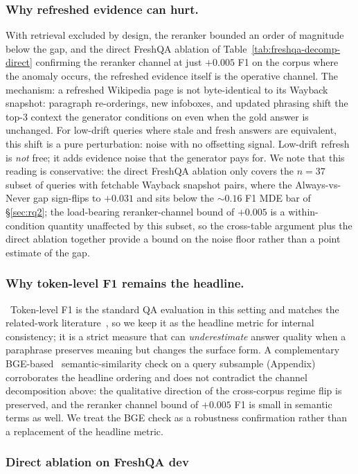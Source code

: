 \documentclass[pdflatex,sn-basic]{sn-jnl}
\begin{document}
\subsubsection*{Why refreshed evidence can hurt.}
With retrieval excluded by design, the reranker bounded an order of magnitude below the gap, and the direct FreshQA ablation of Table~\ref{tab:freshqa-decomp-direct} confirming the reranker channel at just $+0.005$ F1 on the corpus where the anomaly occurs, the refreshed evidence itself is the operative channel. The mechanism: a refreshed Wikipedia page is not byte-identical to its Wayback snapshot: paragraph re-orderings, new infoboxes, and updated phrasing shift the top-$3$ context the generator conditions on even when the gold answer is unchanged. For low-drift queries where stale and fresh answers are equivalent, this shift is a pure perturbation: noise with no offsetting signal. Low-drift refresh is \emph{not} free; it adds evidence noise that the generator pays for. We note that this reading is conservative: the direct FreshQA ablation only covers the $n{=}37$ subset of queries with fetchable Wayback snapshot pairs, where the Always-vs-Never gap sign-flips to $+0.031$ and sits below the ${\sim}0.16$ F1 MDE bar of §\ref{sec:rq2}; the load-bearing reranker-channel bound of $+0.005$ is a within-condition quantity unaffected by this subset, so the cross-table argument plus the direct ablation together provide a bound on the noise floor rather than a point estimate of the gap.

\subsubsection*{Why token-level F1 remains the headline.}~Token-level F1 is the standard QA evaluation in this setting and matches the related-work literature~\cite{vu2023freshqa,vu2023freshllms}, so we keep it as the headline metric for internal consistency; it is a strict measure that can \emph{underestimate} answer quality when a paraphrase preserves meaning but changes the surface form. A complementary BGE-based~\cite{bge2023} semantic-similarity check on a query subsample (Appendix) corroborates the headline ordering and does not contradict the channel decomposition above: the qualitative direction of the cross-corpus regime flip is preserved, and the reranker channel bound of $+0.005$ F1 is small in semantic terms as well. We treat the BGE check as a robustness confirmation rather than a replacement of the headline metric.

\subsubsection{Direct ablation on FreshQA dev}
\label{sec:rq2-decomp-direct}
\end{document}
